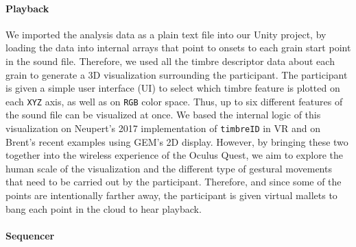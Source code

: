 \documentclass{nime-alternate}
\begin{document}
\paragraph{Playback}

We imported the analysis data as a plain text file into our Unity project, by loading the data into internal arrays that point to onsets to each grain start point in the sound file. Therefore, we used all the timbre descriptor data about each grain to generate a 3D visualization surrounding the participant. The participant is given a simple user interface (UI) to select which timbre feature is plotted on each \texttt{XYZ} axis, as well as on \texttt{RGB} color space. Thus, up to six different features of the sound file can be visualized at once. We based the internal logic of this visualization on Neupert's 2017 implementation of \texttt{timbreID} in VR and on Brent's recent examples using GEM's 2D display. However, by bringing these two together into the wireless experience of the Oculus Quest, we aim to explore the human scale of the visualization and the different type of gestural movements that need to be carried out by the participant. Therefore, and since some of the points are intentionally farther away, the participant is given virtual mallets to bang each point in the cloud to hear playback.


\paragraph{Sequencer}
\end{document}
